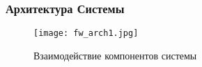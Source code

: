 \subsubsection{Архитектура Системы}

\begin{figure}[!h]
    \centering
    \texttt{[image: fw\_arch1.jpg]}
    \caption{Взаимодействие компонентов системы}
    \label{fw_arch1}
\end{figure}
